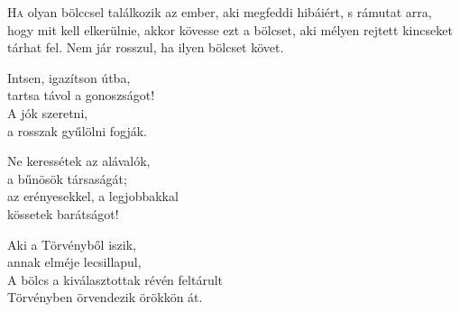 
\vspace*{-2\baselineskip}

\begin{firstdhpverse}[-18pt]{76}
\lettrine{H}{a} {\LettrineTextFont olyan bölccsel találkozik}\newline
az ember, aki megfeddi hibáiért,\newline
s rámutat arra, hogy mit kell elkerülnie,\newline
akkor kövesse ezt a bölcset,\newline
aki mélyen rejtett kincseket tárhat fel.\newline
Nem jár rosszul, ha ilyen bölcset követ.
\end{firstdhpverse}

\begin{dhpverse}

 Intsen, igazítson útba,\\
tartsa távol a gonoszságot!\\
A jók szeretni,\\
a rosszak gyűlölni fogják.

 Ne keressétek az alávalók,\\
a bűnösök társaságát;\\
az erényesekkel, a legjobbakkal\\
kössetek barátságot!

 Aki a Törvényből iszik,\\
annak elméje lecsillapul,\\
A bölcs a kiválasztottak révén feltárult\\
Törvényben örvendezik örökkön át.

\end{dhpverse}
\newpage
